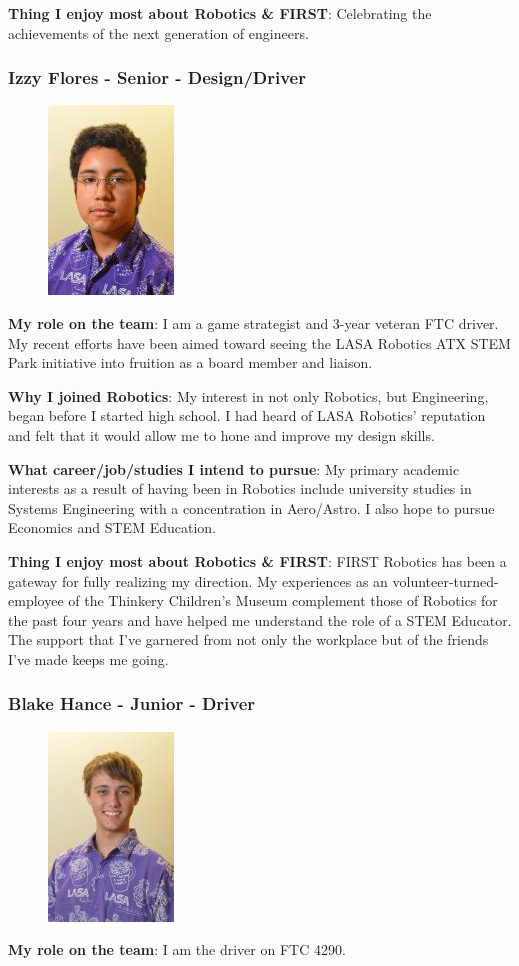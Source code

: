 {\bf Thing I enjoy most about Robotics \& FIRST}: Celebrating the achievements of the next generation of engineers.

\subsubsection{Izzy Flores - Senior - Design/Driver} 
\begin{figure}[H]
	\includegraphics[width=0.2\linewidth]{izzy}
\end{figure}
{\bf My role on the team}: I am a game strategist and 3-year veteran FTC driver. My recent efforts have been aimed toward seeing the LASA Robotics ATX STEM Park initiative into fruition as a board member and liaison.

{\bf Why I joined Robotics}: My interest in not only Robotics, but Engineering, began before I started high school. I had heard of LASA Robotics' reputation and felt that it would allow me to hone and improve my design skills.

{\bf What career/job/studies I intend to pursue}: My primary academic interests as a result of having been in Robotics include university studies in Systems Engineering with a concentration in Aero/Astro. I also hope to pursue Economics and STEM Education.

{\bf Thing I enjoy most about Robotics \& FIRST}: FIRST Robotics has been a gateway for fully realizing my direction. My experiences as an volunteer-turned-employee of the Thinkery Children's Museum complement those of Robotics for the past four years and have helped me understand the role of a STEM Educator. The support that I've garnered from not only the workplace but of the friends I've made keeps me going.

\subsubsection{Blake Hance - Junior - Driver} 
\begin{figure}[H]
	\includegraphics[width=0.2\linewidth]{blake}
\end{figure}
{\bf My role on the team}: I am the driver on FTC 4290.

